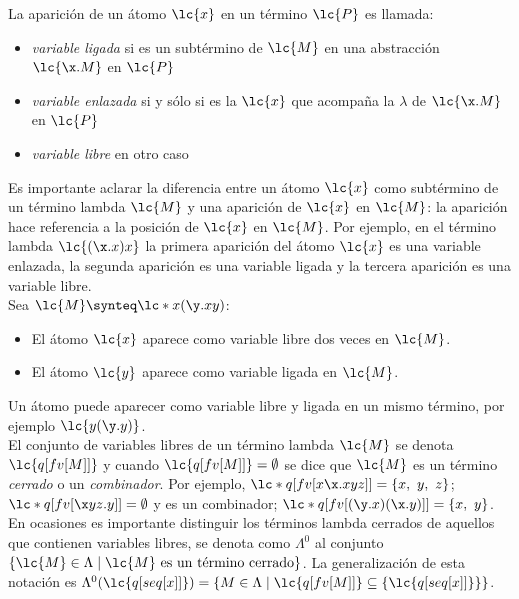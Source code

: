 La aparición de un átomo \(\lc{x}\) en un término \(\lc{P}\) es llamada:

\begin{itemize}
\item \emph{variable ligada} si es un subtérmino de \(\lc{M}\) en una abstracción
  \(\lc{\x.M}\) en \(\lc{P}\)
\item \emph{variable enlazada} si y sólo si es la \(\lc{x}\) que
  acompaña la \(\lambda\) de \(\lc{\x.M}\) en \(\lc{P}\)
\item \emph{variable libre} en otro caso
\end{itemize}

Es importante aclarar la diferencia entre un átomo \(\lc{x}\) como subtérmino de un término
lambda \(\lc{M}\) y una aparición de \(\lc{x}\) en \(\lc{M}\): la aparición hace
referencia a la posición de \(\lc{x}\) en \(\lc{M}\). Por ejemplo, en el término
lambda \(\lc{(\x.x)x}\) la primera aparición del átomo \(\lc{x}\) es una
variable enlazada, la segunda aparición es una variable ligada y la
tercera aparición es una variable libre. \\

Sea \(\lc{M} \synteq \lc*{x(\y.x y)}\):

\begin{itemize}
\item El átomo \(\lc{x}\) aparece como variable libre dos veces en
  \(\lc{M}\).
\item El átomo \(\lc{y}\) aparece como variable ligada en \(\lc{M}\).
\end{itemize}

Un átomo puede aparecer como variable libre y ligada en un mismo término, por
ejemplo \(\lc{y(\y.y)}\). \\

El conjunto de variables libres de un término lambda \(\lc{M}\) se denota
\(\lc{q[fv[M]]}\) y cuando \(\lc{q[fv[M]]}=\emptyset\) se dice que \(\lc{M}\) es
un término \emph{cerrado} o un \emph{combinador}. Por ejemplo, \(\lc*{q[fv[x
  \x.x y z]]} = \left\{ x,\ y,\ z \right\}\); \(\lc*{q[fv[\x y z.y]]} =
\emptyset\) y es un combinador; \(\lc*{q[fv[(\y.x)(\x.y)]]}=\left\{ x,\ y
\right\}\). \\

En ocasiones es importante distinguir los términos lambda cerrados de aquellos
que contienen variables libres, se denota como \(\Lambda^{0}\) al conjunto \(\{\lc{M}
\in \Lambda \mid \lc{M} \text{ es un término cerrado}\}\). La generalización de
esta notación es \(\Lambda^{0}(\lc{q[seq[x]]})=\{M\in\Lambda \mid
\lc{q[fv[M]]}\subseteq \{\lc{q[seq[x]]}\}\}\). \\

